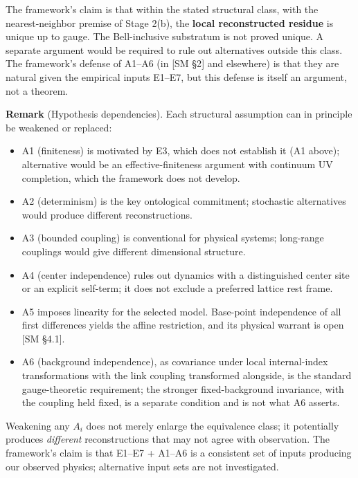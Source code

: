 \documentclass[
]{article}
\providecommand{\tightlist}{%
  \setlength{\itemsep}{0pt}\setlength{\parskip}{0pt}}
\begin{document}
The framework's claim is that within the stated structural class, with
the nearest-neighbor premise of Stage 2(b), the \textbf{local
reconstructed residue} is unique up to gauge. The Bell-inclusive
substratum is not proved unique. A separate argument would be required
to rule out alternatives outside this class. The framework's defense of
A1--A6 (in {[}SM §2{]} and elsewhere) is that they are natural given the
empirical inputs E1--E7, but this defense is itself an argument, not a
theorem.

\textbf{Remark} (Hypothesis dependencies). Each structural assumption
can in principle be weakened or replaced:

\begin{itemize}
\tightlist
\item
  A1 (finiteness) is motivated by E3, which does not establish it (A1
  above); alternative would be an effective-finiteness argument with
  continuum UV completion, which the framework does not develop.
\item
  A2 (determinism) is the key ontological commitment; stochastic
  alternatives would produce different reconstructions.
\item
  A3 (bounded coupling) is conventional for physical systems; long-range
  couplings would give different dimensional structure.
\item
  A4 (center independence) rules out dynamics with a distinguished
  center site or an explicit self-term; it does not exclude a preferred
  lattice rest frame.
\item
  A5 imposes linearity for the selected model. Base-point independence
  of all first differences yields the affine restriction, and its
  physical warrant is open {[}SM §4.1{]}.
\item
  A6 (background independence), as covariance under local internal-index
  transformations with the link coupling transformed alongside, is the
  standard gauge-theoretic requirement; the stronger fixed-background
  invariance, with the coupling held fixed, is a separate condition and
  is not what A6 asserts.
\end{itemize}

Weakening any \(A_i\) does not merely enlarge the equivalence class; it
potentially produces \emph{different} reconstructions that may not agree
with observation. The framework's claim is that E1--E7 + A1--A6 is a
consistent set of inputs producing our observed physics; alternative
input sets are not investigated.
\end{document}
